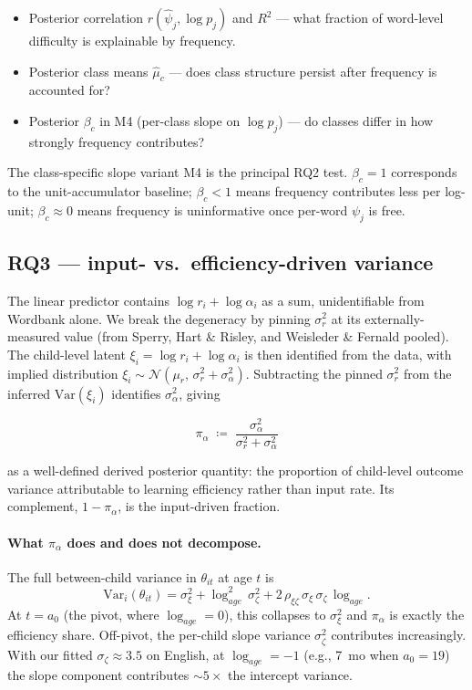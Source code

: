 \documentclass[11pt]{article}
\newcommand{\Var}{\mathrm{Var}}
\newcommand{\Norm}{\mathcal{N}}
\begin{document}
\begin{itemize}[leftmargin=1.3em]
\item Posterior correlation \(r(\hat\psi_j, \log p_j)\) and \(R^2\) —
  what fraction of word-level difficulty is explainable by frequency.
\item Posterior class means \(\hat\mu_c\) — does class structure
  persist after frequency is accounted for?
\item Posterior \(\beta_c\) in M4 (per-class slope on \(\log p_j\)) —
  do classes differ in how strongly frequency contributes?
\end{itemize}

The class-specific slope variant M4 is the principal RQ2 test.
\(\beta_c = 1\) corresponds to the unit-accumulator baseline;
\(\beta_c < 1\) means frequency contributes less per log-unit;
\(\beta_c \approx 0\) means frequency is uninformative once per-word
\(\psi_j\) is free.

\subsection*{RQ3 — input- vs.\ efficiency-driven variance}
\label{sec:identifiability}

The linear predictor contains \(\log r_i + \log \alpha_i\) as a sum,
unidentifiable from Wordbank alone. We break the degeneracy by pinning
\(\sigma_r^2\) at its externally-measured value (from Sperry, Hart \&
Risley, and Weisleder \& Fernald pooled). The child-level latent
\(\xi_i = \log r_i + \log \alpha_i\) is then identified from the data,
with implied distribution
\(\xi_i \sim \Norm(\mu_r,\, \sigma_r^2 + \sigma_\alpha^2)\).
Subtracting the pinned \(\sigma_r^2\) from the inferred \(\Var(\xi_i)\)
identifies \(\sigma_\alpha^2\), giving

\begin{equation}
\pi_\alpha \;\coloneqq\; \frac{\sigma_\alpha^2}{\sigma_r^2 + \sigma_\alpha^2}
\end{equation}

as a well-defined derived posterior quantity: the proportion of
child-level outcome variance attributable to learning efficiency rather
than input rate. Its complement, \(1 - \pi_\alpha\), is the input-driven
fraction.

\paragraph{What \(\pi_\alpha\) does and does not decompose.}
The full between-child variance in \(\theta_{it}\) at age \(t\) is
\[
\Var_i(\theta_{it})
= \sigma_\xi^2
+ \log_{age}^2\,\sigma_\zeta^2
+ 2\,\rho_{\xi\zeta}\,\sigma_\xi\,\sigma_\zeta\,\log_{age}.
\]
At \(t = a_0\) (the pivot, where \(\log_{age} = 0\)), this collapses
to \(\sigma_\xi^2\) and \(\pi_\alpha\) is exactly the efficiency
share. Off-pivot, the per-child slope variance \(\sigma_\zeta^2\)
contributes increasingly. With our fitted \(\sigma_\zeta \approx 3.5\)
on English, at \(\log_{age} = -1\) (e.g., 7~mo when \(a_0 = 19\)) the
slope component contributes \(\sim 5\!\times\) the intercept variance.
\end{document}
